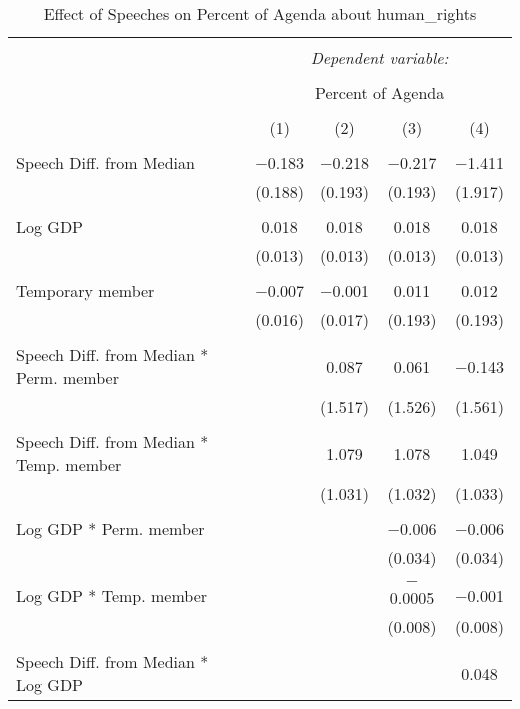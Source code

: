 
\begin{table}[!htbp] \centering 
  \caption{Effect of Speeches on Percent of Agenda about human_rights} 
  \label{} 
\begin{tabular}{@{\extracolsep{5pt}}lcccc} 
\\[-1.8ex]\hline 
\hline \\[-1.8ex] 
 & \multicolumn{4}{c}{\textit{Dependent variable:}} \\ 
\cline{2-5} 
\\[-1.8ex] & \multicolumn{4}{c}{Percent of Agenda} \\ 
\\[-1.8ex] & (1) & (2) & (3) & (4)\\ 
\hline \\[-1.8ex] 
 Speech Diff. from Median & $-$0.183 & $-$0.218 & $-$0.217 & $-$1.411 \\ 
  & (0.188) & (0.193) & (0.193) & (1.917) \\ 
  & & & & \\ 
 Log GDP & 0.018 & 0.018 & 0.018 & 0.018 \\ 
  & (0.013) & (0.013) & (0.013) & (0.013) \\ 
  & & & & \\ 
 Temporary member & $-$0.007 & $-$0.001 & 0.011 & 0.012 \\ 
  & (0.016) & (0.017) & (0.193) & (0.193) \\ 
  & & & & \\ 
 Speech Diff. from Median * Perm. member &  & 0.087 & 0.061 & $-$0.143 \\ 
  &  & (1.517) & (1.526) & (1.561) \\ 
  & & & & \\ 
 Speech Diff. from Median * Temp. member &  & 1.079 & 1.078 & 1.049 \\ 
  &  & (1.031) & (1.032) & (1.033) \\ 
  & & & & \\ 
 Log GDP * Perm. member &  &  & $-$0.006 & $-$0.006 \\ 
  &  &  & (0.034) & (0.034) \\ 
  & & & & \\ 
 Log GDP * Temp. member &  &  & $-$0.0005 & $-$0.001 \\ 
  &  &  & (0.008) & (0.008) \\ 
  & & & & \\ 
 Speech Diff. from Median * Log GDP &  &  &  & 0.048 \\ 

\end{tabular}
\end{table}
